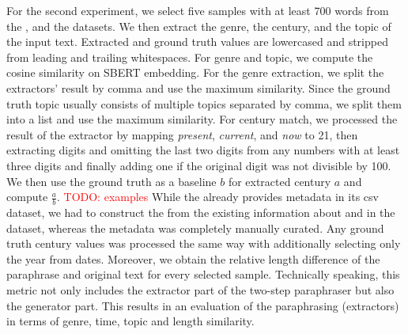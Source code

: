 For the second experiment, we select five samples with at least 700 words from the \dataBlog{}, \dataGutenberg{} and the \dataStudent{} datasets. 
We then extract the genre, the century, and the topic of the input text.
Extracted and ground truth values are lowercased and stripped from leading and trailing whitespaces. 
For genre and topic, we compute the cosine similarity on SBERT embedding.
For the genre extraction, we split the extractors' result by comma and use the maximum similarity.
Since the ground truth topic usually consists of multiple topics separated by comma, we split them into a list and use the maximum similarity.
For century match, we processed the result of the extractor by mapping \textit{present}, \textit{current}, and \textit{now} to 21, then extracting digits and omitting the last two digits from any numbers with at least three digits and finally adding one if the original digit was not divisible by 100.
We then use the ground truth as a baseline $b$ for extracted century $a$ and compute $\frac{a}{b}$.
\textcolor{red}{TODO: examples}
While the \dataBlog{} already provides metadata in its csv dataset, we had to construct the \dataStudent{} from the existing information about and in the dataset, whereas the \dataGutenberg{} metadata was completely manually curated.
Any ground truth century values was processed the same way with additionally selecting only the year from dates.
Moreover, we obtain the relative length difference of the paraphrase and original text for every selected sample. 
Technically speaking, this metric not only includes the extractor part of the two-step paraphraser but also the generator part.
This results in an evaluation of the paraphrasing (extractors) in terms of genre, time, topic and length similarity.